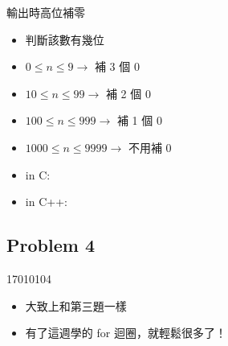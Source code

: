 \documentclass[t]{beamer}
\begin{document}
\begin{frame}{輸出時高位補零}
  \begin{itemize}
    \item 判斷該數有幾位
    \item $0 \le n \le 9 \rightarrow$ 補 3 個 0
    \item $10 \le n \le 99 \rightarrow$ 補 2 個 0
    \item $100 \le n \le 999 \rightarrow$ 補 1 個 0
    \item $1000 \le n \le 9999 \rightarrow$ 不用補 0
  \end{itemize}
  \begin{itemize}
    \item in C: 
    \item in C++:  
  \end{itemize}
\end{frame}

\subsection{Problem 4}
\begin{frame}{17010104}
  \begin{itemize}
    \item 大致上和第三題一樣
    \item 有了這週學的 for 迴圈，就輕鬆很多了！
  \end{itemize}
\end{frame}
\end{document}
